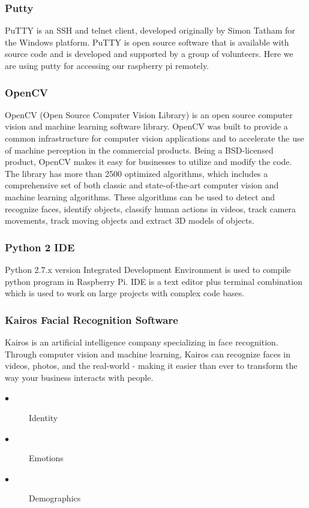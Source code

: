 \documentclass[sigconf]{acmart}
\begin{document}
\subsubsection{Putty}
PuTTY is an SSH and telnet client, developed originally by Simon Tatham for the Windows platform. PuTTY is open source software that is available with source code and is developed and supported by a group of volunteers. Here we are using putty for accessing our raspberry pi remotely.

\subsubsection{OpenCV}
OpenCV (Open Source Computer Vision Library) is an open source computer vision and machine learning software library. OpenCV was built to provide a common infrastructure for computer vision applications and to accelerate the use of machine perception in the commercial products. Being a BSD-licensed product, OpenCV makes it easy for businesses to utilize and modify the code. The library has more than 2500 optimized algorithms, which includes a comprehensive set of both classic and state-of-the-art computer vision and machine learning algorithms. These algorithms can be used to detect and recognize faces, identify objects, classify human actions in videos, track camera movements, track moving objects and extract 3D models of objects.

\subsubsection{Python 2 IDE}
Python 2.7.x version Integrated Development Environment is used to compile python program in Raspberry Pi. IDE is a text editor plus terminal combination which is used to work on large projects with complex code bases.

\subsubsection{Kairos Facial Recognition Software}
Kairos is an artificial intelligence company specializing in face recognition. Through computer vision and machine learning, Kairos can recognize faces in videos, photos, and the real-world - making it easier than ever to transform the way your business interacts with people.
\begin{description}
  \item[$\bullet$] Identity 
  \item[$\bullet$] Emotions 
  \item[$\bullet$] Demographics
\end{description}
\end{document}
